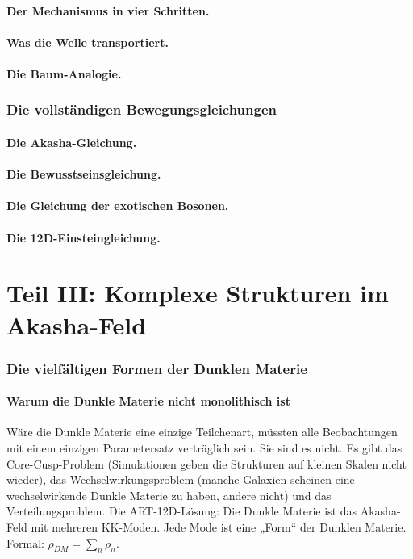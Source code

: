 \documentclass[11pt,a4paper]{article}
\begin{document}
\subsection{Der Mechanismus in vier Schritten.}
\subsection{Was die Welle transportiert.}
\subsection{Die Baum-Analogie.}

\section{Die vollständigen Bewegungsgleichungen}
\subsection{Die Akasha-Gleichung.}
\subsection{Die Bewusstseinsgleichung.}
\subsection{Die Gleichung der exotischen Bosonen.}
\subsection{Die 12D-Einsteingleichung.}

\newpage
\part*{Teil III: Komplexe Strukturen im Akasha-Feld}

\section{Die vielfältigen Formen der Dunklen Materie}
\subsection{Warum die Dunkle Materie nicht monolithisch ist}
Wäre die Dunkle Materie eine einzige Teilchenart, müssten alle Beobachtungen mit einem einzigen Parametersatz verträglich sein. Sie sind es nicht. Es gibt das Core-Cusp-Problem (Simulationen geben die Strukturen auf kleinen Skalen nicht wieder), das Wechselwirkungsproblem (manche Galaxien scheinen eine wechselwirkende Dunkle Materie zu haben, andere nicht) und das Verteilungsproblem. Die ART-12D-Lösung: Die Dunkle Materie ist das Akasha-Feld mit mehreren KK-Moden. Jede Mode ist eine „Form`` der Dunklen Materie. Formal: $\rho_{DM} = \sum_n \rho_n$.
\end{document}
